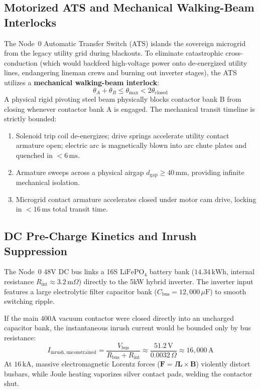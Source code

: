 \subsection{Motorized ATS and Mechanical Walking-Beam Interlocks}
The Node~0 Automatic Transfer Switch (ATS) islands the sovereign microgrid from the legacy utility grid during blackouts. To eliminate catastrophic cross-conduction (which would backfeed high-voltage power onto de-energized utility lines, endangering lineman crews and burning out inverter stages), the ATS utilizes a \textbf{mechanical walking-beam interlock}:
\begin{equation}
\theta_A + \theta_B \le \theta_{\max} < 2\theta_{\mathrm{closed}}
\label{eq:walking_beam_constraint}
\end{equation}
A physical rigid pivoting steel beam physically blocks contactor bank B from closing whenever contactor bank A is engaged. The mechanical transit timeline is strictly bounded:
\begin{enumerate}
    \item Solenoid trip coil de-energizes; drive springs accelerate utility contact armature open; electric arc is magnetically blown into arc chute plates and quenched in $<6\,\mathrm{ms}$.
    \item Armature sweeps across a physical airgap $d_{\mathrm{gap}} \ge 40\,\mathrm{mm}$, providing infinite mechanical isolation.
    \item Microgrid contact armature accelerates closed under motor cam drive, locking in $<16\,\mathrm{ms}$ total transit time.
\end{enumerate}

\subsection{DC Pre-Charge Kinetics and Inrush Suppression}
The Node~0 48V DC bus links a 16S $\mathrm{LiFePO}_4$ battery bank ($14.34\,\mathrm{kWh}$, internal resistance $R_{\mathrm{int}} \approx 3.2\,\mathrm{m}\Omega$) directly to the 5kW hybrid inverter. The inverter input features a large electrolytic filter capacitor bank ($C_{\mathrm{bus}} = 12,000\,\mu\mathrm{F}$) to smooth switching ripple.

If the main 400A vacuum contactor were closed directly into an uncharged capacitor bank, the instantaneous inrush current would be bounded only by bus resistance:
\begin{equation}
I_{\mathrm{inrush, unconstrained}} = \frac{V_{\mathrm{bus}}}{R_{\mathrm{bus}} + R_{\mathrm{int}}} \approx \frac{51.2\,\mathrm{V}}{0.0032\,\Omega} \approx 16,000\,\mathrm{A}
\label{eq:inrush_catastrophe}
\end{equation}
At $16\,\mathrm{kA}$, massive electromagnetic Lorentz forces ($\mathbf{F} = I \mathbf{L} \times \mathbf{B}$) violently distort busbars, while Joule heating vaporizes silver contact pads, welding the contactor shut.

